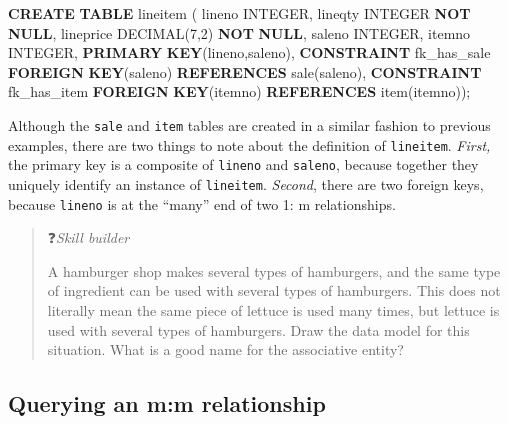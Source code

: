 \documentclass[
]{article}
\newenvironment{Shaded}{\begin{snugshade}}{\end{snugshade}}
\newcommand{\DataTypeTok}[1]{\textcolor[rgb]{0.13,0.29,0.53}{#1}}
\newcommand{\DecValTok}[1]{\textcolor[rgb]{0.00,0.00,0.81}{#1}}
\newcommand{\KeywordTok}[1]{\textcolor[rgb]{0.13,0.29,0.53}{\textbf{#1}}}
\newcommand{\NormalTok}[1]{#1}
\begin{document}
\begin{Shaded}
\begin{Highlighting}[]
\KeywordTok{CREATE} \KeywordTok{TABLE}\NormalTok{ lineitem (}
\NormalTok{    lineno      }\DataTypeTok{INTEGER}\NormalTok{,}
\NormalTok{    lineqty     }\DataTypeTok{INTEGER} \KeywordTok{NOT} \KeywordTok{NULL}\NormalTok{,}
\NormalTok{    lineprice       }\DataTypeTok{DECIMAL}\NormalTok{(}\DecValTok{7}\NormalTok{,}\DecValTok{2}\NormalTok{) }\KeywordTok{NOT} \KeywordTok{NULL}\NormalTok{,}
\NormalTok{    saleno      }\DataTypeTok{INTEGER}\NormalTok{,}
\NormalTok{    itemno      }\DataTypeTok{INTEGER}\NormalTok{,}
        \KeywordTok{PRIMARY} \KeywordTok{KEY}\NormalTok{(lineno,saleno),}
        \KeywordTok{CONSTRAINT}\NormalTok{ fk\_has\_sale }\KeywordTok{FOREIGN} \KeywordTok{KEY}\NormalTok{(saleno)}
            \KeywordTok{REFERENCES}\NormalTok{ sale(saleno),}
        \KeywordTok{CONSTRAINT}\NormalTok{ fk\_has\_item }\KeywordTok{FOREIGN} \KeywordTok{KEY}\NormalTok{(itemno)}
            \KeywordTok{REFERENCES}\NormalTok{ item(itemno));}
\end{Highlighting}
\end{Shaded}

Although the \texttt{sale} and \texttt{item} tables are created in a similar fashion to previous examples, there are two things to note about the definition of \texttt{lineitem}. \emph{First,} the primary key is a composite of \texttt{lineno} and \texttt{saleno}, because together they uniquely identify an instance of \texttt{lineitem}. \emph{Second}, there are two foreign keys, because \texttt{lineno} is at the ``many'' end of two 1: m relationships.

\begin{quote}
❓\emph{Skill builder}

A hamburger shop makes several types of hamburgers, and the same type of ingredient can be used with several types of hamburgers. This does not literally mean the same piece of lettuce is used many times, but lettuce is used with several types of hamburgers. Draw the data model for this situation. What is a good name for the associative entity?
\end{quote}

\hypertarget{querying-an-mm-relationship}{%
\subsection*{Querying an m:m relationship}\label{querying-an-mm-relationship}}
\end{document}
